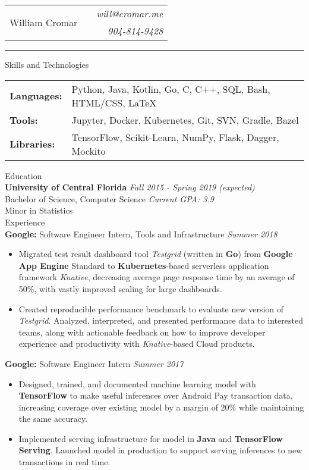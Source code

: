 \documentclass[letterpaper,11pt,oneside]{article}
\newcommand{\mkheader}[3]{
  {\fontfamily{pag}\selectfont
  \begin{tabularx}{\textwidth}{lXr}
    \multirow{2}{*}{\Huge #1} && \emph{#2}
    \\ && \emph{#3}
  \end{tabularx}
  }
  \vspace{2pt}
  \hrule
}
\newcommand{\resheader}[2][]{
  \vspace{9pt}
  {\LARGE #2} #1
  \\
}
\newcommand{\ressubheader}[3][]{
  \vspace{6pt}
  {\textbf{#2} #1} \hfill \emph{#3}
  \\
}
\newcommand{\resskill}[1]{\textbf{#1}}
\begin{document}
\mkheader{William Cromar}{will@cromar.me}{904-814-9428}

\resheader{Skills and Technologies}
\vspace{6pt}
\begin{tabular}{>{\bfseries}l@{\hskip .25cm} l}
  Languages: & Python, Java, Kotlin, Go, C, C++, SQL, Bash, HTML/CSS, LaTeX \\
  Tools: & Jupyter, Docker, Kubernetes, Git, SVN, Gradle, Bazel \\
  Libraries: & TensorFlow, Scikit-Learn, NumPy, Flask, Dagger, Mockito \\
\end{tabular}


\resheader{Education}
\ressubheader{University of Central Florida}{Fall 2015 - Spring 2019 (expected)}
Bachelor of Science, Computer Science \hfill \emph{Current GPA: 3.9} \\
Minor in Statistics \\

\resheader{Experience}
\ressubheader[Software Engineer Intern, Tools and Infrastructure]{Google:}{Summer 2018}
\begin{itemize}
  \item Migrated test result dashboard tool \emph{Testgrid} (written in \resskill{Go}) from \resskill{Google App Engine} Standard to \resskill{Kubernetes}-based serverless application framework \emph{Knative}, decreasing average page response time by an average of 50\%, with vastly improved scaling for large dashboards.
  \item Created reproducible performance benchmark to evaluate new version of \emph{Testgrid}. Analyzed, interpreted, and presented performance data to interested teams, along with actionable feedback on how to improve developer experience and productivity with \emph{Knative}-based Cloud products.
\end{itemize}

\ressubheader[Software Engineer Intern]{Google:}{Summer 2017}
\begin{itemize}
  \item Designed, trained, and documented machine learning model with \resskill{TensorFlow} to make useful inferences over Android Pay transaction data, increasing coverage over existing model by a margin of 20\% while maintaining the same accuracy.
  \item Implemented serving infrastructure for model in \resskill{Java} and \resskill{TensorFlow Serving}. Launched model in production to support serving inferences to new transactions in real time.
\end{itemize}
\end{document}
